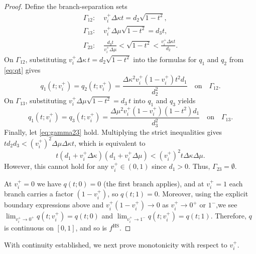 \documentclass[preprint,3p]{elsarticle}
\begin{document}
\begin{proof}
    Define the branch-separation sets
    \begin{subequations}
    \begin{align}
    \Gamma_{12}:\; &v_i^+ \Delta\kappa t= d_2\sqrt{1-t^2},\\
    \Gamma_{13}:\; &v_i^+ \Delta\mu \sqrt{1-t^2} = d_3 t,\\
    \Gamma_{23}:\; & \frac{d_3 t}{v_i^{+} \Delta \mu} < \sqrt{1-t^2} < \frac{v_i^{+}\Delta \kappa t} {d_2}.\label{eq:gamma23}
    \end{align}
    \end{subequations}
    On $\Gamma_{12}$, substituting $v_i^+ \Delta\kappa\, t = d_2 \sqrt{1-t^2}$ into the formulas for $q_1$ and $q_2$ from \eqref{eq:qt} gives
    \begin{equation}
         q_1(t;v_i^+) = q_2(t;v_i^+) = \frac{\Delta\kappa^2 v_i^+ (1 - v_i^+) t^2 d_1}{d_2^2} \quad \text{on}\quad \Gamma_{12}.
    \end{equation}
    On $\Gamma_{13}$, substituting $v_i^+ \Delta\mu\sqrt{1-t^2} = d_3\, t$ into $q_1$ and $q_3$ yields
    \begin{equation}
        q_1(t;v_i^+) = q_3(t;v_i^+) = \frac{\Delta\mu^2 v_i^+ (1 - v_i^+) (1 - t^2) d_1}{d_3^2}
 \quad \text{on}\quad \Gamma_{13}.
    \end{equation}
    Finally, let \eqref{eq:gamma23} hold. Multiplying the strict inequalities gives $t d_2 d_3 < (v_i^+)^2 \Delta\mu \Delta\kappa t$, which is equivalent to
    \begin{equation}
        t(d_1 + v_i^+ \Delta\kappa)(d_1 + v_i^+\Delta\mu) < (v_i^+)^2 t \Delta\kappa \Delta\mu.
    \end{equation}
    However, this cannot hold for any $v_i^+ \in (0,1)$ since $d_1 > 0$. Thus, $\Gamma_{23} = \emptyset$.
    
    At $v_i^+=0$ we have $q(t;0)=0$ (the first branch applies), and at $v_i^+=1$ each branch carries a factor $(1-v_i^+)$, so $q(t;1)=0$. Moreover, using the explicit boundary expressions above and $v_i^+(1-v_i^+)\to 0$ as $v_i^+\to 0^+$ or $1^-$,we see $\lim_{v_i^+\to 0^+}q(t;v_i^+)=q(t;0)$ and $\lim_{v_i^+\to 1^-}q(t;v_i^+)=q(t;1)$. Therefore, $q$ is continuous on $[0,1]$, and so is $f^{\mathrm{HS}}$.
\end{proof}

With continuity established, we next prove monotonicity with respect to $v_i^+$.
\end{document}
